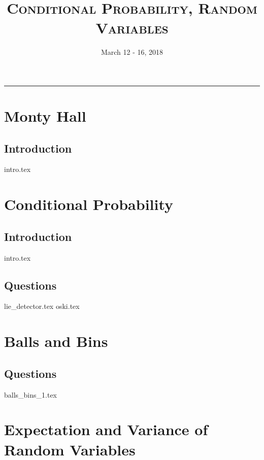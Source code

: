 \documentclass{exam}
\title{\textsc{Conditional Probability, Random Variables}}
\date{March 12 - 16, 2018}
\begin{document}
\maketitle
\rule{\textwidth}{0.15em}
\fontsize{12}{15}\selectfont
\thispagestyle{empty}


\section{Monty Hall}
\subsection{Introduction}
{intro.tex}

\section{Conditional Probability}
\subsection{Introduction}
{intro.tex}
\subsection{Questions}
\begin{questions}
{lie_detector.tex}
{oski.tex}
\end{questions}

\section{Balls and Bins}
\begin{questions}
\subsection{Questions}
{balls_bins_1.tex}
\end{questions}

\section{Expectation and Variance of Random Variables}
\end{document}
